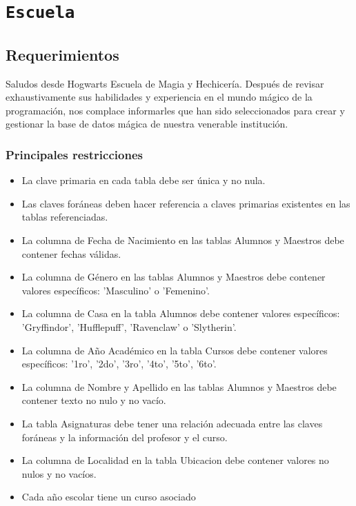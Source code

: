 \section{\texttt{Escuela}}
  
\subsection{Requerimientos}

Saludos desde Hogwarts Escuela de Magia y Hechicería. Después de revisar exhaustivamente sus habilidades y
experiencia en el mundo mágico de la programación, nos complace informarles que han sido seleccionados para 
crear y gestionar la base de datos mágica de nuestra venerable institución.

\subsubsection*{Principales restricciones}
\begin{itemize}
    \item La clave primaria en cada tabla debe ser única y no nula.
    \item Las claves foráneas deben hacer referencia a claves primarias existentes en las tablas referenciadas.
    \item La columna de Fecha de Nacimiento en las tablas Alumnos y Maestros debe contener fechas válidas.
    \item La columna de Género en las tablas Alumnos y Maestros debe contener valores específicos: 'Masculino' o 'Femenino'.
    \item La columna de Casa en la tabla Alumnos debe contener valores específicos: 'Gryffindor', 'Hufflepuff', 'Ravenclaw' o 'Slytherin'.
    \item La columna de Año Académico en la tabla Cursos debe contener valores específicos: '1ro', '2do', '3ro', '4to', '5to', '6to'.    
    \item La columna de Nombre y Apellido en las tablas Alumnos y Maestros debe contener texto no nulo y no vacío.
    \item La tabla Asignaturas debe tener una relación adecuada entre las claves foráneas y la información del profesor y el curso.
    \item La columna de Localidad en la tabla Ubicacion debe contener valores no nulos y no vacíos.  
    \item Cada año escolar tiene un curso asociado 
\end{itemize}

